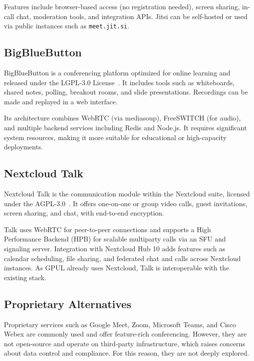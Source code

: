 Features include browser-based access (no registration needed), screen sharing, in-call chat, moderation tools, and integration APIs. Jitsi can be self-hosted or used via public instances such as \texttt{meet.jit.si}.

\subsection*{BigBlueButton}

BigBlueButton is a conferencing platform optimized for online learning and released under the LGPL-3.0 License~\cite{bigbluebutton-docs}. It includes tools such as whiteboards, shared notes, polling, breakout rooms, and slide presentations. Recordings can be made and replayed in a web interface.

Its architecture combines WebRTC (via mediasoup), FreeSWITCH (for audio), and multiple backend services including Redis and Node.js. It requires significant system resources, making it more suitable for educational or high-capacity deployments.

\subsection*{Nextcloud Talk}

Nextcloud Talk is the communication module within the Nextcloud suite, licensed under the AGPL-3.0~\cite{nextcloud-talk-docs}. It offers one-on-one or group video calls, guest invitations, screen sharing, and chat, with end-to-end encryption.

Talk uses WebRTC for peer-to-peer connections and supports a High Performance Backend (HPB) for scalable multiparty calls via an SFU and signaling server. Integration with Nextcloud Hub 10 adds features such as calendar scheduling, file sharing, and federated chat and calls across Nextcloud instances. As GPUL already uses Nextcloud, Talk is interoperable with the existing stack.

\subsection*{Proprietary Alternatives}

Proprietary services such as Google Meet, Zoom, Microsoft Teams, and Cisco Webex are commonly used and offer feature-rich conferencing. However, they are not open-source and operate on third-party infrastructure, which raises concerns about data control and compliance. For this reason, they are not deeply explored.
